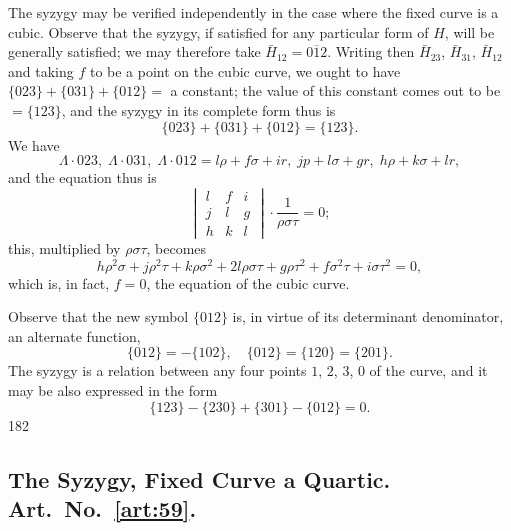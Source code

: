 \documentclass[11pt,a4paper]{book}
\begin{document}
\begin{art}\label{art:58}
The syzygy may be verified independently in the case where the fixed curve is a cubic. Observe that the syzygy, if satisfied for any particular form of $H$, will be generally satisfied; we may therefore take $\bar{H}_{12} = \overline{012}$. Writing then $\bar{H}_{23}$, $\bar{H}_{31}$, $\bar{H}_{12}$ and taking $f$ to be a point on the cubic curve, we ought to have $\{023\} + \{031\} + \{012\} = $ a constant; the value of this constant comes out to be $= \{123\}$, and the syzygy in its complete form thus is
\[
\{023\} + \{031\} + \{012\} = \{123\}.
\]
We have
\[
\Lambda \cdot 023,\; \Lambda \cdot 031,\; \Lambda \cdot 012 = l\rho + f\sigma + ir,\; jp + l\sigma + gr,\; h\rho + k\sigma + lr,
\]
and the equation thus is
\[
\begin{vmatrix}
l & f & i \\
j & l & g \\
h & k & l
\end{vmatrix} \cdot \frac{1}{\rho\sigma\tau} = 0;
\]
this, multiplied by $\rho\sigma\tau$, becomes
\[
h\rho^2\sigma + j\rho^2\tau + k\rho\sigma^2 + 2l\rho\sigma\tau + g\rho\tau^2 + f\sigma^2\tau + i\sigma\tau^2 = 0,
\]
which is, in fact, $f = 0$, the equation of the cubic curve.

Observe that the new symbol $\{012\}$ is, in virtue of its determinant denominator, an alternate function,
\[
\{012\} = -\{102\}, \quad \{012\} = \{120\} = \{201\}.
\]
The syzygy is a relation between any four points $1$, $2$, $3$, $0$ of the curve, and it may be also expressed in the form
\[
\{123\} - \{230\} + \{301\} - \{012\} = 0.
\]
182
\end{art}

\newpage
\subsection*{The Syzygy, Fixed Curve a Quartic. Art.~No.~\ref{art:59}.}
\end{document}
